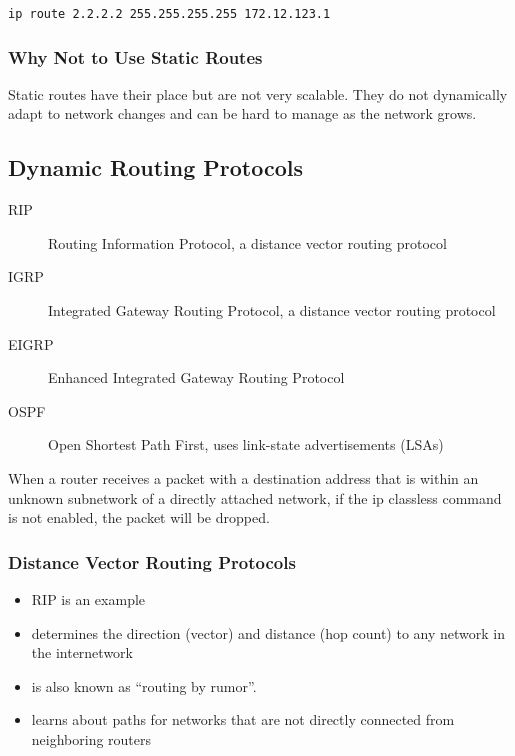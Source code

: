 \begin{verbatim}
ip route 2.2.2.2 255.255.255.255 172.12.123.1
\end{verbatim}

\subsubsection{Why Not to Use Static Routes}

Static routes have their place but are not very scalable. They do not
dynamically adapt to network changes and can be hard to manage as the network
grows.

\subsection{Dynamic Routing Protocols}

\begin{description}
\item[RIP]
Routing Information Protocol, a distance vector routing protocol
\item[IGRP]
Integrated Gateway Routing Protocol, a distance vector routing protocol
\item[EIGRP]
Enhanced Integrated Gateway Routing Protocol
\item[OSPF]
Open Shortest Path First, uses link-state advertisements (LSAs)
\end{description}

When a router receives a packet with a destination address that is within an
unknown subnetwork of a directly attached network, if the ip classless command
is not enabled, the packet will be dropped.

\subsubsection{Distance Vector Routing Protocols}

\begin{itemize}

\item RIP is an example

\item determines the direction (vector) and distance (hop count) to any network
in the internetwork

\item is also known as ``routing by rumor''.

\item learns about paths for networks that are not directly connected from
neighboring routers

\end{itemize}

